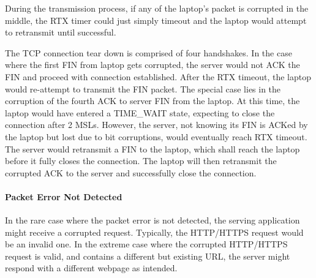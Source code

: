 \documentclass[12pt,letterpaper]{article}
\begin{document}
During the transmission process, if any of the laptop's packet is corrupted in the middle, the RTX timer could just simply timeout and the laptop would attempt to retransmit until successful.

The TCP connection tear down is comprised of four handshakes. In the case where the first FIN from laptop gets corrupted, the server would not ACK the FIN and proceed with connection established. After the RTX timeout, the laptop would re-attempt to transmit the FIN packet. The special case lies in the corruption of the fourth ACK to server FIN from the laptop. At this time, the laptop would have entered a TIME\_WAIT state, expecting to close the connection after 2 MSLs. However, the server, not knowing its FIN is ACKed by the laptop but lost due to bit corruptions, would eventually reach RTX timeout. The server would retransmit a FIN to the laptop, which shall reach the laptop before it fully closes the connection. The laptop will then retransmit the corrupted ACK to the server and successfully close the connection.

\paragraph{Packet Error Not Detected}

In the rare case where the packet error is not detected, the serving application might receive a corrupted request. Typically, the HTTP/HTTPS request would be an invalid one. In the extreme case where the corrupted HTTP/HTTPS request is valid, and contains a different but existing URL, the server might respond with a different webpage as intended.
\end{document}
